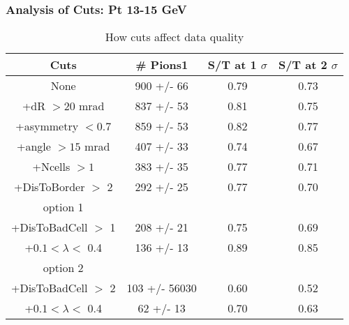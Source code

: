 \frame
{
\frametitle{Analysis of Cuts: Pt 13-15 GeV}
\begin{table}
\caption{How cuts affect data quality}
\centering
\begin{tabular}{c c c c}
\hline\hline
Cuts & \# Pions1 & S/T at 1 $\sigma$ & S/T at 2 $\sigma$ \\ [0.5ex]
\hline
None &  900 +/-   66 & 0.79 & 0.73 \\ %
+dR $> 20$ mrad &  837 +/-   53 & 0.81 & 0.75 \\ %
+asymmetry $< 0.7$ &  859 +/-   53 & 0.82 & 0.77 \\ %
+angle $> 15$ mrad &  407 +/-   33 & 0.74 & 0.67 \\ %
+Ncells $> 1$&  383 +/-   35 & 0.77 & 0.71 \\ %
+DisToBorder $>$ 2 &  292 +/-   25 & 0.77 & 0.70 \\ %
option 1\\
+DisToBadCell $>$ 1&  208 +/-   21 & 0.75 & 0.69 \\ %
+$0.1 < \lambda <$ 0.4 &  136 +/-   13 & 0.89 & 0.85 \\ %
option 2\\
+DisToBadCell $>$ 2&  103 +/- 56030 & 0.60 & 0.52 \\ %
+$0.1 < \lambda <$ 0.4 &   62 +/-   13 & 0.70 & 0.63 \\ %
[1ex]
\hline
\end{tabular}
\label{table:nonlin}
\end{table}
}
